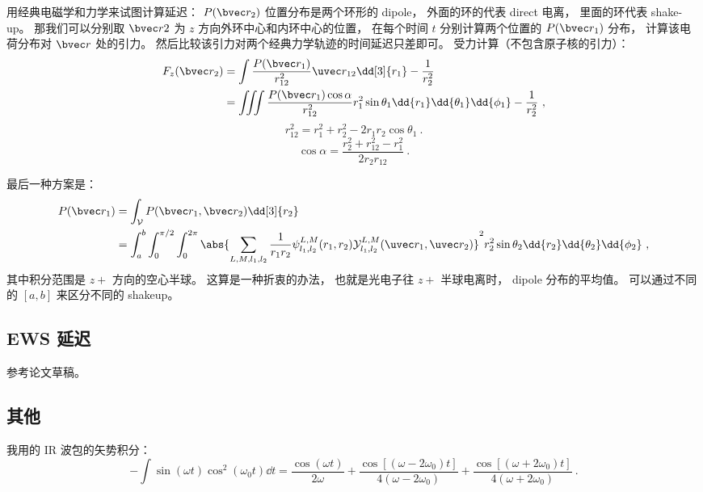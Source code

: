 用经典电磁学和力学来试图计算延迟： $P(\bvec r_2)$ 位置分布是两个环形的 dipole， 外面的环的代表 direct 电离， 里面的环代表 shake-up。 那我们可以分别取 $\bvec r2$ 为 $z$ 方向外环中心和内环中心的位置， 在每个时间 $t$ 分别计算两个位置的 $P(\bvec r_1)$ 分布， 计算该电荷分布对 $\bvec r$ 处的引力。 然后比较该引力对两个经典力学轨迹的时间延迟只差即可。 受力计算（不包含原子核的引力）：
\begin{equation}\label{eq_HeAnal_19}
\begin{aligned}
F_z(\bvec r_2) &= 
\int \frac{P(\bvec r_1)}{r_{12}^2}\uvec r_{12} \dd[3]{r_1} - \frac{1}{r_2^2}\\
&= \iiint \frac{P(\bvec r_1) \cos\alpha}{r_{12}^2} r_1^2\sin\theta_1 \dd{r_1}\dd{\theta_1}\dd{\phi_1} - \frac{1}{r_2^2}~,
\end{aligned}
\end{equation}
\begin{equation}
r_{12}^2 = r_1^2 + r_2^2 - 2r_1r_2 \cos\theta_1~.
\end{equation}
\begin{equation}
\cos\alpha = \frac{r_2^2 + r_{12}^2 - r_1^2}{2r_2 r_{12}}~.
\end{equation}

最后一种方案是：
\begin{equation}\label{eq_HeAnal_26}
\begin{aligned}
P(\bvec r_1) &= \int_{\mathcal V} P(\bvec r_1, \bvec r_2) \dd[3]{r_2}\\
&= \int_a^b  \int_0^{\pi/2} \int_0^{2\pi} \abs{\sum_{L, M, l_1, l_2}  \frac{1}{r_1 r_2} \psi_{l_1, l_2}^{L, M}(r_1, r_2)\mathcal{Y}_{l_1, l_2}^{L, M}(\uvec r_1, \uvec r_2)}^2 r_2^2\sin\theta_2\dd{r_2} \dd{\theta_2} \dd{\phi_2}~,
\end{aligned}
\end{equation}
其中积分范围是 $z+$ 方向的空心半球。 这算是一种折衷的办法， 也就是光电子往 $z+$ 半球电离时， dipole 分布的平均值。 可以通过不同的 $[a, b]$ 来区分不同的 shakeup。

\subsection{EWS 延迟}
参考论文草稿。

\subsection{其他}
我用的 IR 波包的矢势积分：
\begin{equation}\label{eq_HeAnal_20}
-\int \sin(\omega t)\cos^2(\omega_0 t) \dd{t} =
\frac{\cos(\omega t)}{2\omega} + \frac{\cos[(\omega-2\omega_0)t]}{4(\omega-2\omega_0)} + \frac{\cos[(\omega+2\omega_0)t]}{4(\omega+2\omega_0)}~.
\end{equation}


